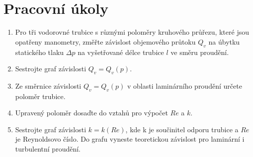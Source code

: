 \documentclass{article}
\author{Vladislav Wohlrath}
\begin{document}
\begin{titlepage}

\end{titlepage}

\section*{Pracovní úkoly}
\begin{enumerate}
\item  Pro tři vodorovné trubice s různými poloměry kruhového průřezu, které jsou opatřeny manometry, změřte závislost objemového průtoku $Q_v$ na úbytku statického tlaku $\Delta p$ na vyšetřované délce trubice $l$ ve směru proudění.
\item Sestrojte graf závislosti $Q_v = Q_v (p)$.
\item Ze směrnice závislosti $Q_v = Q_v (p)$ v oblasti laminárního proudění určete poloměr trubice.
\item Upravený poloměr dosaďte do vztahů pro výpočet $Re$ a $k$.
\item Sestrojte graf závislosti $k = k(Re)$, kde k je součinitel odporu trubice a $Re$ je Reynoldsovo číslo. Do grafu vyneste teoretickou závislost pro laminární i turbulentní proudění.
\end{enumerate}














\end{document}

